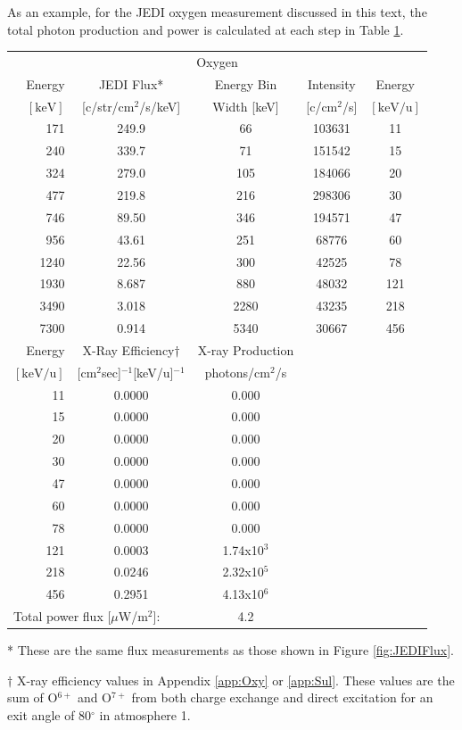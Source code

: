 \documentclass[draft]{agujournal2018}
\begin{document}
As an example, for the JEDI oxygen measurement discussed in this text, the total photon production and power is calculated at each step in Table \ref{tab:JEDIFlux}.

\begin{table}[ht]
    \centering
    \begin{tabular}{r|c|c|c|c}
    \multicolumn{5}{c}{Oxygen} \\ \cline{1-5}
    Energy & JEDI Flux* & Energy Bin & Intensity & Energy  \\
    $\mathrm{[keV]}$ & [c/str/cm$^2$/s/keV] & Width [keV] & [c/cm$^2$/s] & $\mathrm{[keV/u]}$ \\ \cline{1-5}
     171  & 249.9 &   66 & 103631 & 11  \\
     240  & 339.7 &   71 & 151542 & 15  \\
     324  & 279.0 &  105 & 184066 & 20  \\
     477  & 219.8 &  216 & 298306 & 30  \\
     746  & 89.50 &  346 & 194571 & 47  \\
     956  & 43.61 &  251 &  68776 & 60  \\
    1240  & 22.56 &  300 &  42525 & 78  \\
    1930  & 8.687 &  880 &  48032 & 121 \\
    3490  & 3.018 & 2280 &  43235 & 218 \\
    7300  & 0.914 & 5340 &  30667 & 456 \\ \cline{1-5}
    Energy  & X-Ray Efficiency$\dagger$ & X-ray Production \\
    $\mathrm{[keV/u]}$ & [cm$^2$sec]$^{-1}$[keV/u]$^{-1}$ & photons/cm$^2$/s \\ \cline{1-3}
    11    & 0.0000 & 0.000 \\
    15    & 0.0000 & 0.000 \\
    20    & 0.0000 & 0.000 \\
    30    & 0.0000 & 0.000 \\
    47    & 0.0000 & 0.000 \\
    60    & 0.0000 & 0.000 \\
    78    & 0.0000 & 0.000 \\
    121   & 0.0003 & 1.74x10$^{3}$  \\
    218   & 0.0246 & 2.32x10$^{5}$  \\
    456   & 0.2951 & 4.13x10$^{6}$ \\ \cline{1-3}
    \multicolumn{2}{l}{Total power flux [$\mu$W/m$^2$]:} & 4.2 \\ \cline{1-3}
    \end{tabular}
    \begin{flushleft}
    * These are the same flux measurements as those shown in Figure \ref{fig:JEDIFlux}.
    
    $\dagger$ X-ray efficiency values in Appendix \ref{app:Oxy} or \ref{app:Sul}. These values are the sum of O$^{6+}$ and O$^{7+}$ from both charge exchange and direct excitation for an exit angle of 80$^{\circ}$ in atmosphere 1.
    \end{flushleft}
    \label{tab:JEDIFlux}
\end{table}
\end{document}

